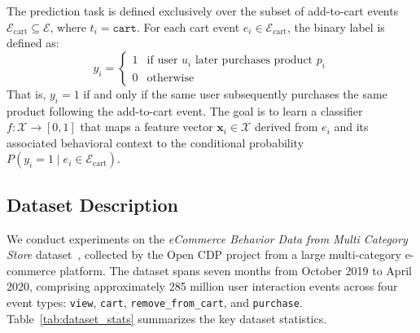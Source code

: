 \documentclass[conference]{IEEEtran}
\begin{document}
The prediction task is defined exclusively over the subset of
add-to-cart events $\mathcal{E}_{\mathrm{cart}} \subseteq \mathcal{E}$,
where $t_i = \texttt{cart}$. For each cart event $e_i \in
\mathcal{E}_{\mathrm{cart}}$, the binary label is defined as:
%
\begin{equation}
  y_i =
  \begin{cases}
    1 & \text{if user } u_i \text{ later purchases product } p_i \\
    0 & \text{otherwise}
  \end{cases}
  \label{eq:label}
\end{equation}
%
That is, $y_i = 1$ if and only if the same user subsequently purchases
the same product following the add-to-cart event. The goal is to learn a
classifier $f\colon \mathcal{X} \rightarrow [0,1]$ that maps a feature
vector $\mathbf{x}_i \in \mathcal{X}$ derived from $e_i$ and its
associated behavioral context to the conditional probability
$P(y_i = 1 \mid e_i \in \mathcal{E}_{\mathrm{cart}})$.

\subsection{Dataset Description}

We conduct experiments on the \textit{eCommerce Behavior Data from Multi
Category Store} dataset~\cite{kechinov2020ecommerce}, collected by the
Open CDP project from a large multi-category e-commerce platform. The
dataset spans seven months from October 2019 to April 2020, comprising
approximately 285 million user interaction events across four event
types: \texttt{view}, \texttt{cart}, \texttt{remove\_from\_cart}, and
\texttt{purchase}. Table~\ref{tab:dataset_stats} summarizes the key dataset
statistics.
\end{document}
